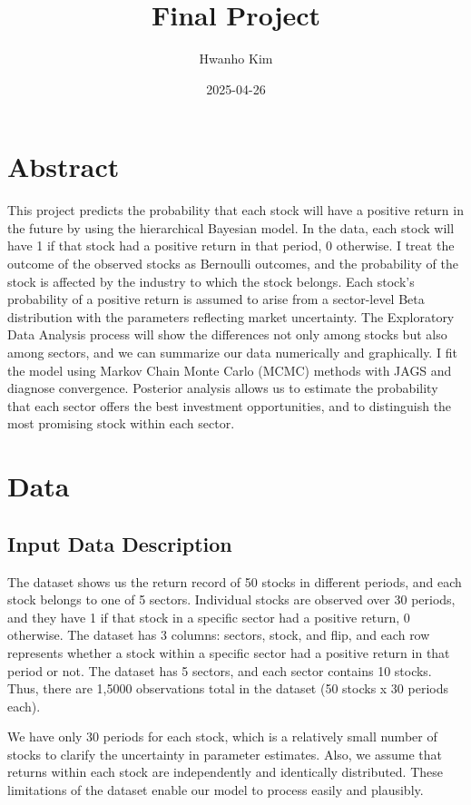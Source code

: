 \documentclass[
  11pt,
]{article}
\title{Final Project}
\author{Hwanho Kim}
\date{2025-04-26}
\begin{document}
\maketitle

\section{Abstract}\label{abstract}

This project predicts the probability that each stock will have a
positive return in the future by using the hierarchical Bayesian model.
In the data, each stock will have 1 if that stock had a positive return
in that period, 0 otherwise. I treat the outcome of the observed stocks
as Bernoulli outcomes, and the probability of the stock is affected by
the industry to which the stock belongs. Each stock's probability of a
positive return is assumed to arise from a sector-level Beta
distribution with the parameters reflecting market uncertainty. The
Exploratory Data Analysis process will show the differences not only
among stocks but also among sectors, and we can summarize our data
numerically and graphically. I fit the model using Markov Chain Monte
Carlo (MCMC) methods with JAGS and diagnose convergence. Posterior
analysis allows us to estimate the probability that each sector offers
the best investment opportunities, and to distinguish the most promising
stock within each sector.

\section{Data}\label{data}

\subsection{Input Data Description}\label{input-data-description}

The dataset shows us the return record of 50 stocks in different
periods, and each stock belongs to one of 5 sectors. Individual stocks
are observed over 30 periods, and they have 1 if that stock in a
specific sector had a positive return, 0 otherwise. The dataset has 3
columns: sectors, stock, and flip, and each row represents whether a
stock within a specific sector had a positive return in that period or
not. The dataset has 5 sectors, and each sector contains 10 stocks.
Thus, there are 1,5000 observations total in the dataset (50 stocks x 30
periods each).

We have only 30 periods for each stock, which is a relatively small
number of stocks to clarify the uncertainty in parameter estimates.
Also, we assume that returns within each stock are independently and
identically distributed. These limitations of the dataset enable our
model to process easily and plausibly.
\end{document}
